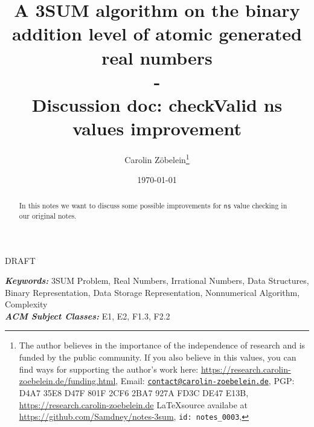 \documentclass{article}
\newtheorem*{theorem A}{Theorem A}
\newtheorem*{theorem B}{N\"olker's Theorem}
\theoremstyle{remark}
\theoremstyle{remark}
\begin{document}
\title{A 3SUM algorithm on the binary addition level of atomic generated real numbers\\
-\\
Discussion doc: checkValid ns values improvement}
\author{Carolin Z\"obelein\thanks{The author believes in the importance of the independence of research and is funded by the public community. If you also believe in this values, you can find ways for supporting the author's work here: \url{https://research.carolin-zoebelein.de/funding.html}, Email: \href{mailto:contact@carolin-zoebelein.de}{\texttt{contact@carolin-zoebelein.de}}, PGP: D4A7 35E8 D47F 801F 2CF6 2BA7 927A FD3C DE47 E13B, \url{https://research.carolin-zoebelein.de} \LaTeX source availabe at \url{https://github.com/Samdney/notes-3sum}, \texttt{id: notes\_0003}, \Cooley}}
\date{\today}
\maketitle
\begin{center}
    DRAFT
\end{center}
\begin{abstract}
    In this notes we want to discuss some possible improvements for \texttt{ns} value checking in our original notes.
\end{abstract}
\providecommand{\keywords}[1]{\small{\textbf{\textit{Keywords:}} #1}}
\providecommand{\Classification}[1]{\small{\textbf{\textit{ACM Subject Classes:}} #1}}

\begin{flushleft}
    \keywords{3SUM Problem, Real Numbers, Irrational Numbers, Data Structures, Binary Representation, Data Storage Representation, Nonnumerical Algorithm, Complexity}\\
    \Classification{E1, E2, F1.3, F2.2}
\end{flushleft}
\tableofcontents
\end{document}
